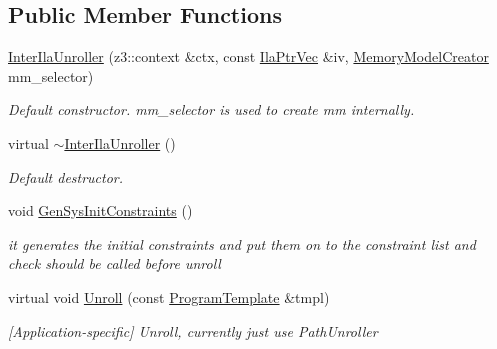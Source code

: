 \subsection*{Public Member Functions}
\begin{DoxyCompactItemize}
\item 
\mbox{\label{classilang_1_1_inter_ila_unroller_a5031e957f9a2b539bbfe3a21af489729}} 
\mbox{\hyperlink{classilang_1_1_inter_ila_unroller_a5031e957f9a2b539bbfe3a21af489729}{Inter\+Ila\+Unroller}} (z3\+::context \&ctx, const \mbox{\hyperlink{classilang_1_1_inter_ila_unroller_aa955b80ccc2435d5c81bb8c3ea3659b2}{Ila\+Ptr\+Vec}} \&iv, \mbox{\hyperlink{classilang_1_1_inter_ila_unroller_a3f06eb0ada6cdaee6ac0e1f7ad511b1c}{Memory\+Model\+Creator}} mm\+\_\+selector)
\begin{DoxyCompactList}\small\item\em Default constructor. mm\+\_\+selector is used to create mm internally. \end{DoxyCompactList}\item 
\mbox{\label{classilang_1_1_inter_ila_unroller_ad3f100076083324362da6147968c2fc2}} 
virtual \mbox{\hyperlink{classilang_1_1_inter_ila_unroller_ad3f100076083324362da6147968c2fc2}{$\sim$\+Inter\+Ila\+Unroller}} ()
\begin{DoxyCompactList}\small\item\em Default destructor. \end{DoxyCompactList}\item 
\mbox{\label{classilang_1_1_inter_ila_unroller_a13dcb99558799f90604282e805f58ec1}} 
void \mbox{\hyperlink{classilang_1_1_inter_ila_unroller_a13dcb99558799f90604282e805f58ec1}{Gen\+Sys\+Init\+Constraints}} ()
\begin{DoxyCompactList}\small\item\em it generates the initial constraints and put them on to the constraint list and check should be called before unroll \end{DoxyCompactList}\item 
virtual void \mbox{\hyperlink{classilang_1_1_inter_ila_unroller_ac56ad07cf9d03caa3f1fb10091779dc0}{Unroll}} (const \mbox{\hyperlink{classilang_1_1_inter_ila_unroller_acc24c6ee17b58b05e18882d73c5affde}{Program\+Template}} \&tmpl)
\begin{DoxyCompactList}\small\item\em \mbox{[}Application-\/specific\mbox{]} Unroll, currently just use Path\+Unroller \end{DoxyCompactList}\item 

\end{DoxyCompactItemize}
